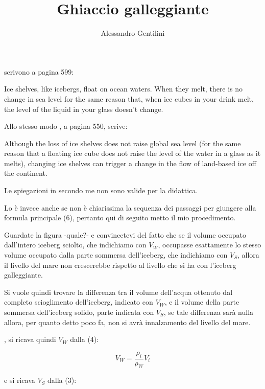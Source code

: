 \documentclass[a4paper]{article}
\begin{document}
\title{Ghiaccio galleggiante}
\author{Alessandro Gentilini}
\maketitle

\cite{grotzinger_understanding_2014} scrivono a pagina 599:

\begin{quoting}
    Ice shelves, like icebergs, float on ocean waters. When they melt,
    there is no change in sea level for the same reason that, when
    ice cubes in your drink melt, the level of the liquid in your glass
    doesn't change.
\end{quoting}

Allo stesso modo \cite{hess_mcknights_2013}, a pagina 550, scrive:

\begin{quoting}
Although the loss of ice shelves does not raise global sea level 
(for the same reason that a floating ice cube does not raise the level of the water in a glass as it melts), 
changing ice shelves can trigger a change in the flow of land-based ice off the continent.
\end{quoting}

Le spiegazioni in \citet{noerdlinger_melting_2007,jenkins_melting_2007} secondo me non sono valide per la didattica.

Lo è invece \cite{lan_does_2010} anche se non è chiarissima la sequenza dei passaggi per giungere alla formula principale (6), 
pertanto qui di seguito metto il mio procedimento.

Guardate la figura -quale?- e convincetevi del fatto che se il volume occupato dall'intero iceberg sciolto, 
che indichiamo con $V_W$, occupasse esattamente lo stesso volume occupato dalla parte sommersa dell'iceberg, 
che indichiamo con $V_S$, allora il livello del mare non crescerebbe rispetto al livello che si ha con 
l'iceberg galleggiante.

Si vuole quindi trovare la differenza tra il volume dell'acqua ottenuto dal completo scioglimento dell'iceberg, indicato con $V_W$,
e il volume della parte sommersa dell'iceberg solido, parte indicata con $V_S$, se tale differenza sarà nulla allora, per quanto
detto poco fa, non si avrà innalzamento del livello del mare.

, si ricava quindi $V_W$ dalla (4):

\[V_W=\frac{\rho_i}{\rho_W}V_i\]

e si ricava $V_S$ dalla (3):
\end{document}
